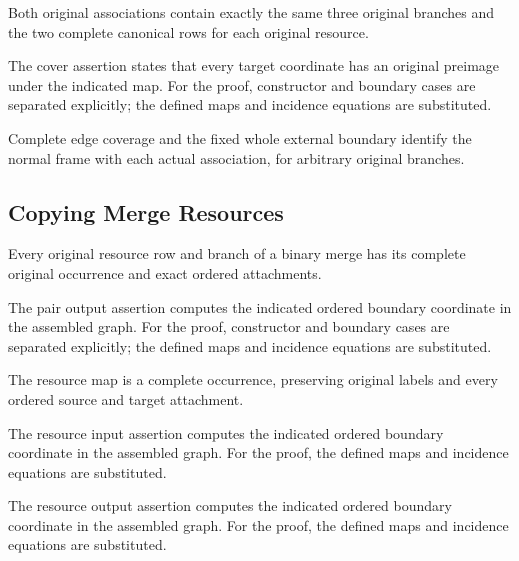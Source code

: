 Both original associations contain exactly the same three original branches and the two complete canonical rows for each original resource.
\par{}

The cover assertion states that every target coordinate has an original preimage under the indicated map.
For the proof, constructor and boundary cases are separated explicitly; the defined maps and incidence equations are substituted.
\par{}

Complete edge coverage and the fixed whole external boundary identify the normal frame with each actual association, for arbitrary original branches.
\par{}

\subsection{Copying Merge Resources}
Every original resource row and branch of a binary merge has its complete original occurrence and exact ordered attachments.

The pair output assertion computes the indicated ordered boundary coordinate in the assembled graph.
For the proof, constructor and boundary cases are separated explicitly; the defined maps and incidence equations are substituted.
\par{}

The resource map is a complete occurrence, preserving original labels and every ordered source and target attachment.
\par{}

The resource input assertion computes the indicated ordered boundary coordinate in the assembled graph.
For the proof, the defined maps and incidence equations are substituted.
\par{}

The resource output assertion computes the indicated ordered boundary coordinate in the assembled graph.
For the proof, the defined maps and incidence equations are substituted.
\par{}

